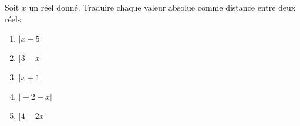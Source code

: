 
Soit $x$ un réel donné. Traduire chaque valeur absolue comme distance entre deux réels.
\begin{enumerate}
\item $\vert x - 5 \vert$
\item $\vert 3 - x \vert$
\item $\vert x + 1 \vert$
\item $\vert -2 - x \vert$
\item $\vert 4 - 2x \vert$
\end{enumerate}  
